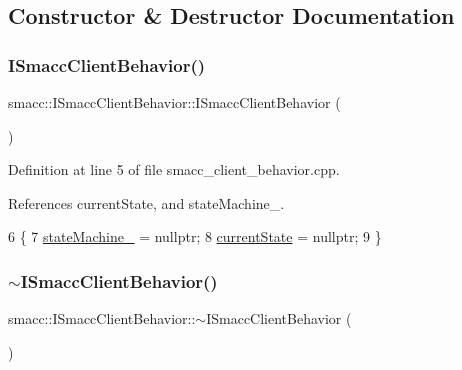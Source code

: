 \subsection{Constructor \& Destructor Documentation}
\mbox{\label{classsmacc_1_1ISmaccClientBehavior_a12fe603a4b66efe6c190c63da422c7d7}} 
\subsubsection{\texorpdfstring{I\+Smacc\+Client\+Behavior()}{ISmaccClientBehavior()}}
{\footnotesize\ttfamily smacc\+::\+I\+Smacc\+Client\+Behavior\+::\+I\+Smacc\+Client\+Behavior (\begin{DoxyParamCaption}{ }\end{DoxyParamCaption})}



Definition at line 5 of file smacc\+\_\+client\+\_\+behavior.\+cpp.



References current\+State, and state\+Machine\+\_\+.


\begin{DoxyCode}
6     \{
7         \hyperlink{classsmacc_1_1ISmaccClientBehavior_a0fea65db292a8bb3dfba3e5840491d79}{stateMachine\_} = \textcolor{keyword}{nullptr};
8         \hyperlink{classsmacc_1_1ISmaccClientBehavior_a5a6658a2deb72b700ae595e594617616}{currentState} = \textcolor{keyword}{nullptr};
9     \}
\end{DoxyCode}
\mbox{\label{classsmacc_1_1ISmaccClientBehavior_a916a04c467ae5e98c5fc11909f0098f3}} 
\subsubsection{\texorpdfstring{$\sim$\+I\+Smacc\+Client\+Behavior()}{~ISmaccClientBehavior()}}
{\footnotesize\ttfamily smacc\+::\+I\+Smacc\+Client\+Behavior\+::$\sim$\+I\+Smacc\+Client\+Behavior (\begin{DoxyParamCaption}{ }\end{DoxyParamCaption})\hspace{0.3cm}{\ttfamily [virtual]}}



